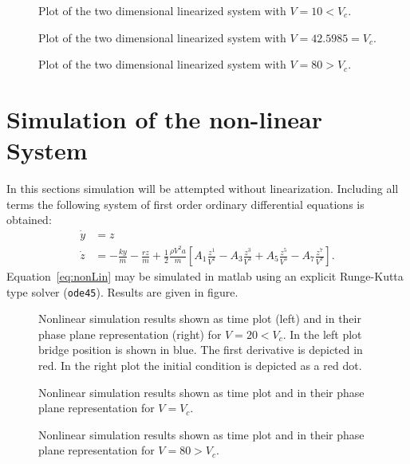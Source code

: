 \begin{figure}
\centering

\caption{Plot of the two dimensional linearized system with $V = 10 < V_c$.}

\caption{Plot of the two dimensional linearized system with $V = 42.5985 = V_c$.}

\caption{Plot of the two dimensional linearized system with $V = 80 > V_c$.}
\end{figure}




\section{Simulation of the non-linear System}
In this sections simulation will be attempted without linearization. Including all terms the following system of first order ordinary differential equations is obtained:
\begin{align}
\dot{y} &= z \\
\dot{z} &= -\frac{ky}{m} - \frac{rz}{m} + \frac{1}{2} \frac{\rho V^2 a}{m} [ A_1\frac{z^1}{V^1} - A_3 \frac{z^3}{V^3} + A_5 \frac{z^5}{V^5} - A_7 \frac{z^7}{V^7} ].
\label{eq:nonLin}
\end{align} 
Equation~\ref{eq:nonLin} may be simulated in matlab using an explicit Runge-Kutta type solver (\texttt{ode45}). Results are given in figure.
\begin{figure}


\caption{Nonlinear simulation results shown as time plot (left) and in their phase plane representation (right) for $V = 20 < V_c$. In the left plot bridge position is shown in blue. The first derivative is depicted in red. In the right plot the initial condition is depicted as a red dot.}
\end{figure}
\begin{figure}


\caption{Nonlinear simulation results shown as time plot and in their phase plane representation for $V = V_c$.}
\end{figure}
\begin{figure}


\caption{Nonlinear simulation results shown as time plot and in their phase plane representation for $V = 80 > V_c$.}
\end{figure}








